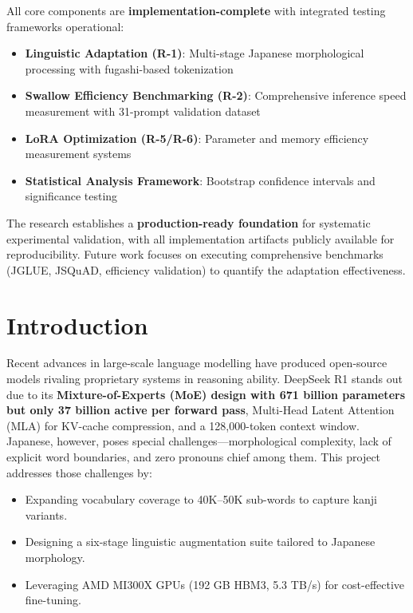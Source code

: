 \documentclass[12pt,a4paper]{article}
\begin{document}
All core components are \textbf{implementation-complete} with integrated testing frameworks operational:

\begin{itemize}
\item \textbf{Linguistic Adaptation (R-1)}: Multi-stage Japanese morphological processing with fugashi-based tokenization
\item \textbf{Swallow Efficiency Benchmarking (R-2)}: Comprehensive inference speed measurement with 31-prompt validation dataset
\item \textbf{LoRA Optimization (R-5/R-6)}: Parameter and memory efficiency measurement systems
\item \textbf{Statistical Analysis Framework}: Bootstrap confidence intervals and significance testing
\end{itemize}

The research establishes a \textbf{production-ready foundation} for systematic experimental validation, with all implementation artifacts publicly available for reproducibility. Future work focuses on executing comprehensive benchmarks (JGLUE, JSQuAD, efficiency validation) to quantify the adaptation effectiveness.

\section{Introduction}

Recent advances in large-scale language modelling have produced open-source models rivaling proprietary systems in reasoning ability. DeepSeek R1 stands out due to its \textbf{Mixture-of-Experts (MoE) design with 671 billion parameters but only 37 billion active per forward pass}, Multi-Head Latent Attention (MLA) for KV-cache compression, and a 128,000-token context window. Japanese, however, poses special challenges—morphological complexity, lack of explicit word boundaries, and zero pronouns chief among them. This project addresses those challenges by:

\begin{itemize}
\item Expanding vocabulary coverage to 40K–50K sub-words to capture kanji variants.
\item Designing a six-stage linguistic augmentation suite tailored to Japanese morphology.
\item Leveraging AMD MI300X GPUs (192 GB HBM3, 5.3 TB/s) for cost-effective fine-tuning.
\end{itemize}
\end{document}
